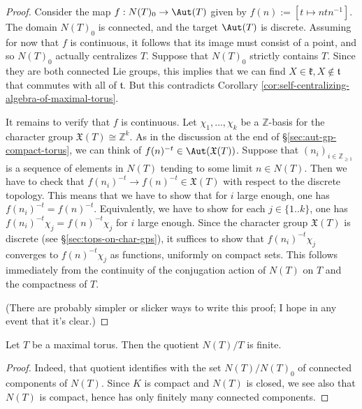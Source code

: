 \documentclass[reqno]{amsart} 
\begin{document}
\begin{proof}
  Consider the map $f : N(T)_0 \rightarrow \Aut(T)$ given by $f(n) := [t \mapsto n t n^{-1}]$.  The domain $N(T)_0$ is connected, and the target $\Aut(T)$ is discrete.  Assuming for now that $f$ is continuous, it follows that its image must consist of a point, and so $N(T)_0$ actually centralizes $T$.  Suppose that $N(T)_0$ strictly contains $T$.  Since they are both connected Lie groups, this implies that we can find $X \in \mathfrak{k}, X \notin \mathfrak{t}$ that commutes with all of $\mathfrak{t}$.  But this contradicts Corollary \ref{cor:self-centralizing-algebra-of-maximal-torus}.

  It remains to verify that $f$ is continuous.  Let $\chi_1, \dotsc, \chi_k$ be a $\mathbb{Z}$-basis for the character group $\mathfrak{X}(T) \cong \mathbb{Z}^k$.  As in the discussion at the end of \S\ref{sec:aut-gp-compact-torus}, we can think of $f(n)^{-t} \in \Aut(\mathfrak{X}(T))$.  Suppose that $(n_i)_{i \in \mathbb{Z}_{\geq 1}}$ is a sequence of elements in $N(T)$ tending to some limit $n \in N(T)$.  Then we have to check that $f(n_i)^{-t} \rightarrow f(n)^{-t} \in \mathfrak{X}(T)$ with respect to the discrete topology.  This means that we have to show that for $i$ large enough, one has $f(n_i)^{-t} = f(n)^{-t}$.  Equivalently, we have to show for each $j \in \{1..k\}$, one has $f(n_i)^{-t} \chi_j = f(n)^{-t} \chi_j$ for $i$ large enough.  Since the character group $\mathfrak{X}(T)$ is discrete (see \S\ref{sec:tops-on-char-gps}), it suffices to show that $f(n_i)^{-t} \chi_j$ converges to $f(n)^{-t} \chi_j$ as functions, uniformly on compact sets.  This follows immediately from the continuity of the conjugation action of $N(T)$ on $T$ and the compactness of $T$.

  (There are probably simpler or slicker ways to write this proof; I hope in any event that it's clear.)
\end{proof}

\begin{corollary}
  Let $T$ be a maximal torus.  Then the quotient $N(T) / T$ is finite.
\end{corollary}
\begin{proof}
  Indeed, that quotient identifies with the set $N(T) / N(T)_0$ of connected components of $N(T)$.  Since $K$ is compact and $N(T)$ is closed, we see also that $N(T)$ is compact, hence has only finitely many connected components.
\end{proof}
\end{document}
